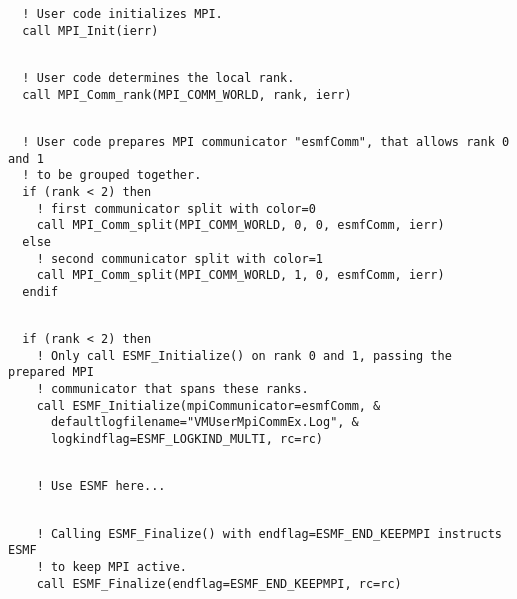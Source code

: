 
 \begin{verbatim}
  ! User code initializes MPI.
  call MPI_Init(ierr)
 
\end{verbatim}
 

 \begin{verbatim}
  ! User code determines the local rank.
  call MPI_Comm_rank(MPI_COMM_WORLD, rank, ierr)
 
\end{verbatim}
 

 \begin{verbatim}
  ! User code prepares MPI communicator "esmfComm", that allows rank 0 and 1
  ! to be grouped together.
  if (rank < 2) then
    ! first communicator split with color=0
    call MPI_Comm_split(MPI_COMM_WORLD, 0, 0, esmfComm, ierr)
  else
    ! second communicator split with color=1
    call MPI_Comm_split(MPI_COMM_WORLD, 1, 0, esmfComm, ierr)
  endif
 
\end{verbatim}
 

 \begin{verbatim}
  if (rank < 2) then
    ! Only call ESMF_Initialize() on rank 0 and 1, passing the prepared MPI
    ! communicator that spans these ranks.
    call ESMF_Initialize(mpiCommunicator=esmfComm, &
      defaultlogfilename="VMUserMpiCommEx.Log", &
      logkindflag=ESMF_LOGKIND_MULTI, rc=rc)
 
\end{verbatim}
 

 \begin{verbatim}
    ! Use ESMF here...
 
\end{verbatim}
 

 \begin{verbatim}
    ! Calling ESMF_Finalize() with endflag=ESMF_END_KEEPMPI instructs ESMF
    ! to keep MPI active.
    call ESMF_Finalize(endflag=ESMF_END_KEEPMPI, rc=rc)
 
\end{verbatim}
 

